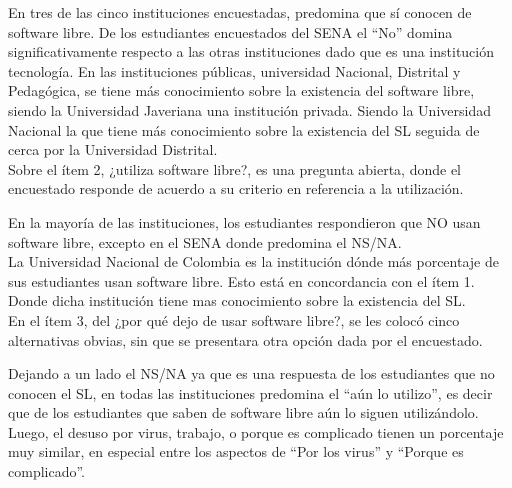\begin{multicols}{2}
\begin{center}
\end{center}

En tres de las cinco instituciones encuestadas, predomina que s\'i conocen de software libre. De los estudiantes encuestados del SENA el “No” domina significativamente respecto a las otras instituciones dado que es una instituci\'on tecnolog\'ia. En las instituciones p\'ublicas, universidad Nacional, Distrital y Pedag\'ogica, se tiene m\'as conocimiento sobre la existencia del software libre, siendo la Universidad Javeriana una instituci\'on privada. Siendo la Universidad Nacional la que tiene m\'as conocimiento sobre la existencia del SL seguida de cerca por la Universidad Distrital.\\

Sobre el \'item 2, ¿utiliza software libre?, es una pregunta abierta, donde el encuestado responde de acuerdo a su criterio en referencia a la utilizaci\'on.\\

\begin{center}
\end{center}


En la mayor\'ia de las instituciones, los estudiantes respondieron que NO usan software libre, excepto en el SENA donde predomina el NS/NA.\\

La Universidad Nacional de Colombia es la instituci\'on d\'onde m\'as porcentaje de sus estudiantes usan software libre. Esto est\'a en concordancia con el \'item 1. Donde dicha instituci\'on tiene mas conocimiento sobre la existencia del SL.\\

En el \'item 3, del ¿por qu\'e dejo de usar software libre?, se les colocó cinco alternativas obvias, sin que se presentara otra opción dada por el encuestado.\\

\begin{center}
\end{center}

Dejando a un lado el NS/NA ya que es una respuesta de los estudiantes que no conocen el SL, en todas las instituciones predomina el “a\'un lo utilizo”, es decir que de los estudiantes que saben de software libre a\'un lo siguen utiliz\'andolo. Luego, el desuso por virus, trabajo, o porque es complicado tienen un porcentaje muy similar, en especial entre los aspectos de “Por los virus” y “Porque es complicado”. \\


\end{multicols}
